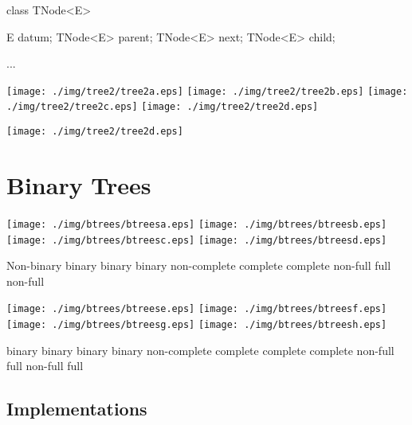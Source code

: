 \documentclass[a4paper, 9pt]{extarticle}
\begin{document}
\begin{blackboard}
class TNode<E> {
    E datum;
    TNode<E> parent;
    TNode<E> next;
    TNode<E> child;

    ...
}
\end{blackboard}

\texttt{[image: ./img/tree2/tree2a.eps]}
\texttt{[image: ./img/tree2/tree2b.eps]}
\texttt{[image: ./img/tree2/tree2c.eps]}
\texttt{[image: ./img/tree2/tree2d.eps]}

\begin{center}
\texttt{[image: ./img/tree2/tree2d.eps]}
\end{center}











\newpage


\section{Binary Trees}



\texttt{[image: ./img/btrees/btreesa.eps]}
\texttt{[image: ./img/btrees/btreesb.eps]}
\texttt{[image: ./img/btrees/btreesc.eps]}
\texttt{[image: ./img/btrees/btreesd.eps]}

\begin{blackboard}
Non-binary               binary                   binary                   binary
                         non-complete             complete                 complete
                         non-full                 full                     non-full
\end{blackboard}

\texttt{[image: ./img/btrees/btreese.eps]}
\texttt{[image: ./img/btrees/btreesf.eps]}
\texttt{[image: ./img/btrees/btreesg.eps]}
\texttt{[image: ./img/btrees/btreesh.eps]}

\begin{blackboard}
binary                   binary                   binary                   binary
non-complete             complete                 complete                 complete
non-full                 full                     non-full                 full
\end{blackboard}

\newpage

\newpage

\subsection{Implementations}
\end{document}
